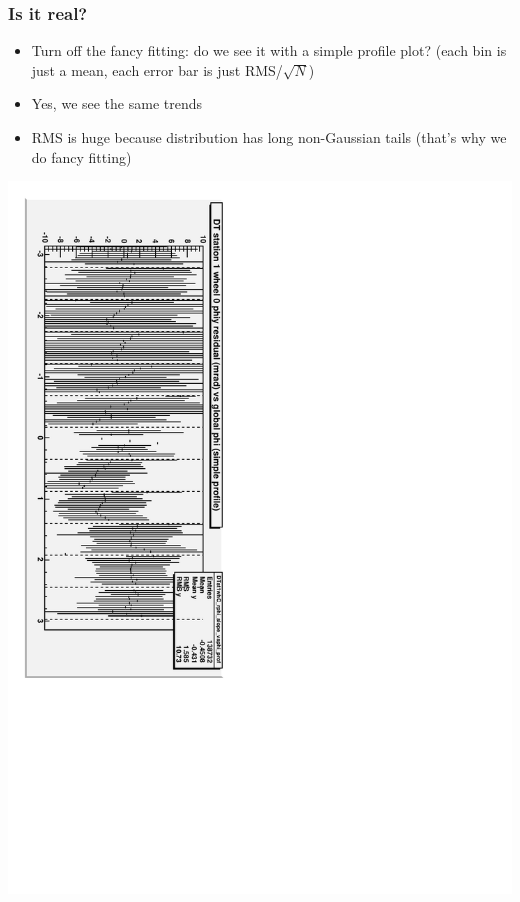 \documentclass[compress]{beamer}
\begin{document}
\begin{frame}
\frametitle{Is it real?}

\begin{itemize}
\item Turn off the fancy fitting: do we see it with a simple profile
  plot? (each bin is just a mean, each error bar is just
  RMS/$\sqrt{N}$)
\item Yes, we see the same trends
\item RMS is huge because distribution has long non-Gaussian
  tails (that's why we do fancy fitting)
\end{itemize}

\includegraphics[height=\linewidth, angle=90]{possible_acoplanarity2.pdf}
\end{frame}
\end{document}
